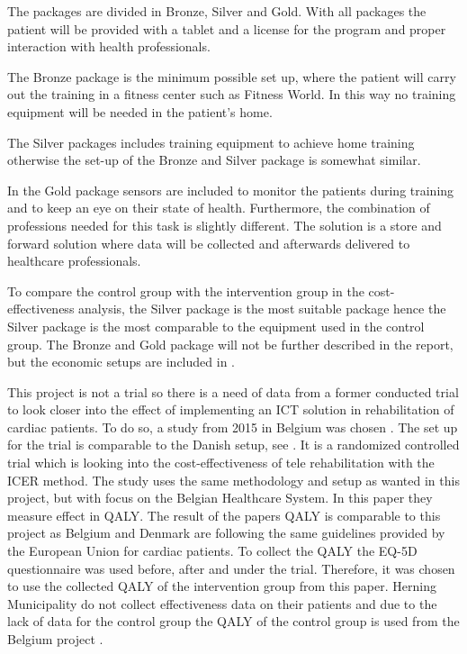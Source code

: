 The packages are divided in Bronze, Silver and Gold. With all packages the patient will be provided with a tablet and a license for the program and proper interaction with health professionals. 

The Bronze package is the minimum possible set up, where the patient will carry out the training in a fitness center such as Fitness World. In this way no training equipment will be needed in the patient’s home. 

The Silver packages includes training equipment to achieve home training otherwise the set-up of the Bronze and Silver package is somewhat similar. 

In the Gold package sensors are included to monitor the patients during training and to keep an eye on their state of health. Furthermore, the combination of professions needed for this task is slightly different. The solution is a store and forward solution where data will be collected and afterwards delivered to healthcare professionals.  

To compare the control group with the intervention group in the cost-effectiveness analysis, the Silver package is the most suitable package hence the Silver package is the most comparable to the equipment used in the control group. The Bronze and Gold package will not be further described in the report, but the economic setups are included in . 

This project is not a trial so there is a need of data from a former conducted trial to look closer into the effect of implementing an ICT solution in rehabilitation of cardiac patients. To do so, a study from 2015 in Belgium was chosen \cite{costeffect}. The set up for the trial is comparable to the Danish setup, see . It is a randomized controlled trial which is looking into the cost-effectiveness of tele rehabilitation with the ICER method. The study uses the same methodology and setup as wanted in this project, but with focus on the Belgian Healthcare System. In this paper they measure effect in QALY. The result of the papers QALY is comparable to this project as Belgium and Denmark are following the same guidelines provided by the European Union for cardiac patients. To collect the QALY the EQ-5D questionnaire was used before, after and under the trial. Therefore, it was chosen to use the collected QALY of the intervention group from this paper. Herning Municipality do not collect effectiveness data on their patients and due to the lack of data for the control group the QALY of the control group is used from the Belgium project \cite{costeffect}.

